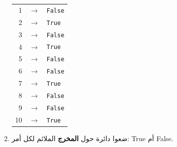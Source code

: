 \documentclass[14pt]{extarticle}
\begin{document}
\begin{enumerate}[label=\textbf{تمرين \arabic*:}, wide=0pt, itemsep=2.2em]
\ifwithsols
\begin{boxSolution}
\begin{english}
\renewcommand{\arraystretch}{1.2}
\begin{tabular}{rcl}
1 & $\rightarrow$ & \texttt{False} \\
2 & $\rightarrow$ & \texttt{True} \\
3 & $\rightarrow$ & \texttt{False} \\
4 & $\rightarrow$ & \texttt{True} \\
5 & $\rightarrow$ & \texttt{False} \\
6 & $\rightarrow$ & \texttt{False} \\
7 & $\rightarrow$ & \texttt{True} \\
8 & $\rightarrow$ & \texttt{False} \\
9 & $\rightarrow$ & \texttt{False} \\
10 & $\rightarrow$ & \texttt{True} \\
\end{tabular}
\end{english}
\end{boxSolution}

\fi

\clearpage
\item ضعوا دائرة حول \textbf{المخرج} الملائم لكل أمر: \textenglish{True} أم \textenglish{False}.


\end{enumerate}
\end{document}
